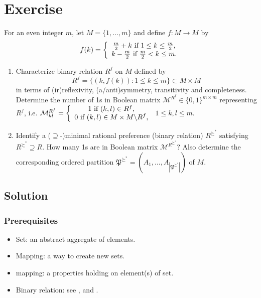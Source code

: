 \documentclass{article}
\begin{document}
\section{Exercise}
For an even integer $m$, let $M=\{1,\ldots,m\}$ and define $f:M\rightarrow M$ by
$$f(k)=\left\{\begin{array}{c}\frac{m}{2}+k\text{ if }1\leq k\leq\frac{m}{2}\text ,\\ k-\frac{m}{2}\text{ if }\frac{m}{2}<k\leq m\text .\end{array}\right .$$
\begin{enumerate}
\item Characterize binary relation $R^f$ on $M$ defined by
$$R^f=\{(k,f(k)):1\leq k\leq m\}\subset M\times M$$
in terms of (ir)reflexivity, (a/anti)symmetry, transitivity and completeness. Determine the number of 1s in Boolean matrix $\mathcal M^{R^f}\in\{0,1\}^{m\times m}$
representing $R^f$, i.e.
$\mathcal M_{kl}^{R^f}=\left\{\begin{array}{c}1\text{ if }(k,l)\in R^f\text ,\\0\text{ if }(k,l)\in M\times M\backslash R^f\text ,\end{array}\right .$
$1\leq k,l\leq m$.

\item Identify a ($\supseteq$-)minimal rational preference (binary relation) $R^{\succsim^*}$ satisfying $R^{\succsim^*}\supseteq R$. How many 1s are in
Boolean matrix $\mathcal M^{R^{\succsim^*}}$? Also determine the corresponding ordered partition $\mathfrak P^{\succsim^*}=(A_1,\ldots,A_{|\mathfrak P^{\succsim^*}|})$
of $M$.
\end{enumerate}

\subsection{Solution}

\subsubsection{Prerequisites}
\begin{itemize}
 \item Set: an abstract aggregate of elements.
 \item Mapping: a way to create new sets.
 \item mapping: a properties holding on element(s) of set.
 \item Binary relation: see \cite{herstein1996}, \cite{herstein1999} and \cite{rossi01}.
\end{itemize}
\end{document}
